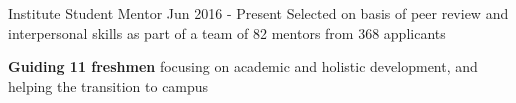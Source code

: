 \begin{cventries}
\cvpor
{Institute Student Mentor} %
{Jun 2016 - Present} %
{Selected on basis of peer review and interpersonal skills as part of a team of 82 mentors from 368 applicants}
{ %
    \begin{cvitems}
        \item {\textbf{Guiding 11 freshmen} focusing on academic and holistic development, and helping the transition to campus}
    \end{cvitems}
}
\end{cventries}